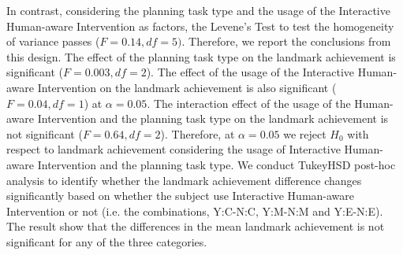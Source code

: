 In contrast, considering the planning task type and the usage of the Interactive Human-aware Intervention as factors, the Levene's Test to test the homogeneity of variance passes ($F=0.14, df=5)$.
Therefore, we report the conclusions from this design.
The effect of the planning task type on the landmark achievement is significant ($F=0.003, df=2$).
The effect of the usage of the Interactive Human-aware Intervention on the landmark achievement is also significant ($F=0.04, df=1$) at $\alpha=0.05$.
The interaction effect of the usage of the Human-aware Intervention and the planning task type on the landmark achievement is not significant ($F=0.64, df=2$).
Therefore, at $\alpha=0.05$ we reject $H_0$ with respect to landmark achievement considering the usage of Interactive Human-aware Intervention and the planning task type.
We conduct TukeyHSD post-hoc analysis to identify whether the landmark achievement difference changes significantly based on whether the subject use Interactive Human-aware Intervention or not (i.e. the combinations, Y:C-N:C, Y:M-N:M and Y:E-N:E). 
The result show that the differences in the mean landmark achievement is not significant for any of the three categories.



